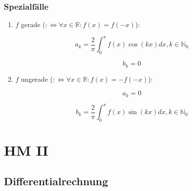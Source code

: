 \documentclass[twoside]{article}
\begin{document}
			\subsubsection{Spezialfälle}
				
				\begin{enumerate}[]
				
					\item \begin{math} f \end{math} gerade (\begin{math} :\Leftrightarrow \forall x \in \mathbb{R}: f(x) = f(-x) \end{math}):
					
						\begin{displaymath}
							a_k = \frac{2}{\pi} \int_{0}^{\pi} f(x) \cos(kx) dx, k \in \mathbb{N}_0
						\end{displaymath}
					
						\begin{displaymath}
							b_k = 0
						\end{displaymath}
					
					\item \begin{math} f \end{math} ungerade (\begin{math} :\Leftrightarrow \forall x \in \mathbb{R}: f(x) = -f(-x) \end{math}):
					
						\begin{displaymath}
							a_k = 0
						\end{displaymath}
						
						\begin{displaymath}
							b_k = \frac{2}{\pi} \int_{0}^{\pi} f(x) \sin(kx) dx, k \in \mathbb{N}_0
						\end{displaymath}
						
									
				\end{enumerate}
	
	\clearpage
			
	\section{HM II}
	
		\subsection{Differentialrechnung}
			
\end{document}
